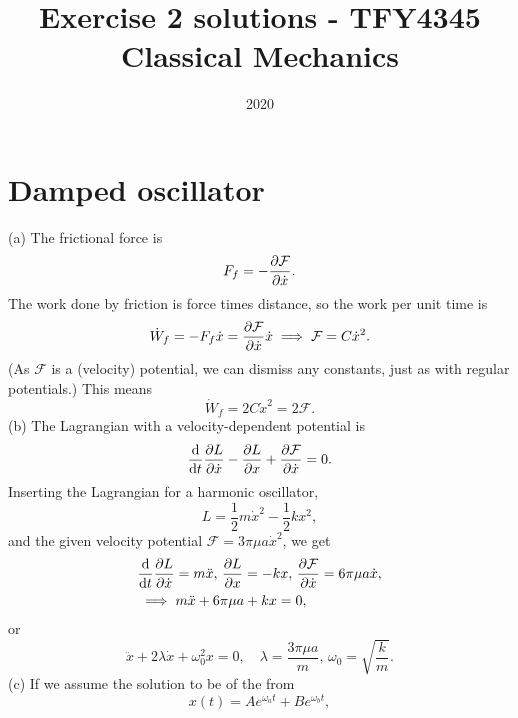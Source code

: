 \documentclass{article}
\title{Exercise 2 solutions - TFY4345 Classical Mechanics}
\date{2020}
\newcommand{\Eff}{\mathcal{F}}
\begin{document}
    \maketitle
    \section{Damped oscillator}
        (a) The frictional force is 
        \begin{equation*}
            F_f = -\pdv{\mathcal{F}}{\dot x}.
        \end{equation*}
        The work done by friction is force times distance, so the work per unit time is
        \begin{equation*}
            \dot W_f = - F_f \dot x = \pdv{\mathcal{F}}{\dot x} \dot x \implies \mathcal{F} = C \dot x ^2.
        \end{equation*}
        (As $\mathcal{F}$ is a (velocity) potential, we can dismiss any constants, just as with regular potentials.) This means
        \begin{equation*}
            \dot W_f = 2 C \dot x^2 = 2 \mathcal{F}. 
        \end{equation*}
        (b) The Lagrangian with a velocity-dependent potential is 
        \begin{equation*}
            \dv{t} \pdv{L}{\dot x} - \pdv{L}{x} + \pdv{\Eff}{\dot x} = 0.
        \end{equation*}
        Inserting the Lagrangian for a harmonic oscillator, 
        \begin{equation*}
            L = \frac{1}{2} m \dot x^2 - \frac{1}{2} k x^2,
        \end{equation*}
        and the given velocity potential $\Eff = 3 \pi \mu a \dot x^2$, we get
        \begin{align*}
            &\dv{t} \pdv{L}{\dot x} = m \ddot x, \, \pdv{L}{x} = -k x, \, \pdv{\Eff}{\dot x} = 6 \pi \mu a \dot x, \\
            &\implies m \ddot x + 6 \pi \mu a + k x = 0,
        \end{align*}
        or
        \begin{equation*}
            \ddot x + 2 \lambda \dot x + \omega^2_0x = 0, \quad \lambda = \frac{3 \pi \mu a}{m}, \, \omega_0 = \sqrt{\frac{k}{m}}.
        \end{equation*}
        (c) 
        If we assume the solution to be of the from
        \begin{equation*}
            x(t) = A e^{\omega_a t} + B e^{\omega_b t},
        \end{equation*}
\end{document}
